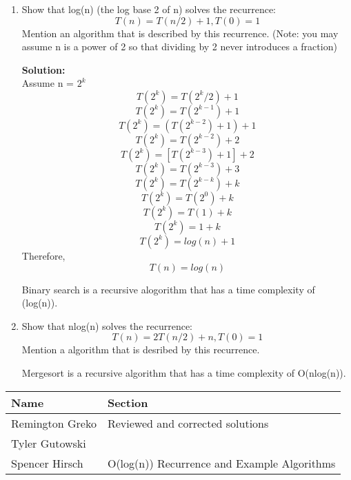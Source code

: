 \documentclass{article}
\begin{document}
\begin{enumerate}
    \item Show that log(n) (the log base 2 of n) solves the recurrence:
            \[T(n) = T(n/2) + 1, T(0) = 1\]
            Mention an algorithm that is described by this recurrence.
            (Note: you may assume n is a power of 2 so that dividing by 2
            never introduces a fraction)

            \textbf{Solution:}\\
            Assume n = $2^k$
            \[T(2^k) = T({2^k}/2) + 1\]
            \[T(2^k) = T(2^{k-1}) + 1\]
            \[T(2^k) = (T(2^{k-2}) + 1) + 1\]
            \[T(2^k) = T(2^{k-2}) + 2\]
            \[T(2^k) = [T(2^{k-3}) + 1] + 2\]
            \[T(2^k) = T(2^{k-3}) + 3\]
            \[T(2^k) = T(2^{k-k}) + k\]
            \[T(2^k) = T(2^{0}) + k\]
            \[T(2^k) = T(1) + k\]
            \[T(2^k) = 1 + k\]
            \[T(2^k) = log(n) + 1\]
            Therefore,\\
            \[T(n) = log(n)\]

            Binary search is a recursive alogorithm that has a time complexity
            of (log(n)).
        


    \item Show that nlog(n) solves the recurrence:
            \[T(n) = 2T(n/2) + n, T(0) = 1\]
            Mention a algorithm that is desribed by this recurrence.

            Mergesort is a recursive algorithm that has a time complexity 
            of O(nlog(n)).
\end{enumerate}

\bigskip

\pagebreak

\begin{center}
        \begin{tabular}{|p{3cm}|p{6cm}|}
            \hline
            \textbf{Name} & \textbf{Section} \\
            \hline
            Remington Greko & Reviewed and corrected solutions\\
            \hline
            Tyler Gutowski & \\
            \hline
            Spencer Hirsch & O(log(n)) Recurrence and Example Algorithms\\
            \hline
        \end{tabular}
    \end{center}
\end{document}
